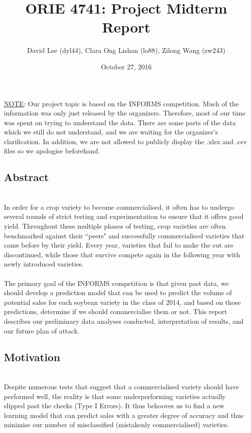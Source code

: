 \documentclass[psamsfonts]{amsart}
\title{ORIE 4741: Project Midterm Report}
\author{David Lee (dyl44), Clara Ong Lishan (lo88), Zilong Wang (zw243)}
\date{October 27, 2016}
\begin{document}
\maketitle

\underline{NOTE}: Our project topic is based on the INFORMS competition. Much of the information was only just released by the organizers. Therefore, most of our time was spent on trying to understand the data. There are some parts of the data which we still do not understand, and we are waiting for the organizer's clarification. In addition, we are not allowed to publicly display the .xlsx and .csv files so we apologise beforehand.

\subsection*{Abstract}
\hfill \\

In order for a crop variety to become commercialised, it often has to undergo several rounds of strict testing and experimentation to ensure that it offers good yield. Throughout these multiple phases of testing, crop varieties are often benchmarked against their ``peers" and successfully commercialised varieties that came before by their yield. Every year, varieties that fail to make the cut are discontinued, while those that survive compete again in the following year with newly introduced varieties.\\
\\
 The primary goal of the INFORMS competition is that given past data, we should develop a prediction model that can be used to predict the volume of potential sales for each soybean variety in the class of 2014, and based on those predictions, determine if we should commercialise them or not. This report describes our preliminary data analyses conducted, interpretation of results, and our future plan of attack. \\


\subsection*{Motivation}
\hfill \\

 Despite numerous tests that suggest that a commercialised variety should have performed well, the reality is that some underperforming varieties actually slipped past the checks (Type I Errors). It thus behooves us to find a new learning model that can predict sales with a greater degree of accuracy and thus minimise our number of misclassified (mistakenly commercialised) varieties.\\
\end{document}
